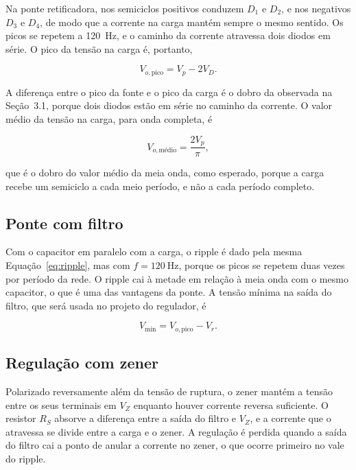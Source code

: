 \documentclass[11pt,a4paper]{article}
\begin{document}
Na ponte retificadora, nos semiciclos positivos conduzem \(D_1\) e \(D_2\), e nos negativos \(D_3\) e \(D_4\), de modo que a corrente na carga mantém sempre o mesmo sentido. Os picos se repetem a \SI{120}{\hertz}, e o caminho da corrente atravessa dois diodos em série. O pico da tensão na carga é, portanto,
 
\begin{equation}
V_{o,\text{pico}} = V_p - 2 V_D .
\label{eq:ponte_pico}
\end{equation}
 
A diferença entre o pico da fonte e o pico da carga é o dobro da observada na Seção~3.1, porque dois diodos estão em série no caminho da corrente. O valor médio da tensão na carga, para onda completa, é
 
\begin{equation}
V_{o,\text{médio}} = \frac{2 V_p}{\pi} ,
\label{eq:ponte_medio}
\end{equation}
 
que é o dobro do valor médio da meia onda, como esperado, porque a carga recebe um semiciclo a cada meio período, e não a cada período completo.
 
\subsection{Ponte com filtro}
 
Com o capacitor em paralelo com a carga, o ripple é dado pela mesma Equação~\eqref{eq:ripple}, mas com \(f = \SI{120}{\hertz}\), porque os picos se repetem duas vezes por período da rede. O ripple cai à metade em relação à meia onda com o mesmo capacitor, o que é uma das vantagens da ponte. A tensão mínima na saída do filtro, que será usada no projeto do regulador, é
 
\begin{equation}
V_{\min} = V_{o,\text{pico}} - V_r .
\label{eq:vmin}
\end{equation}
 
\subsection{Regulação com zener}
 
Polarizado reversamente além da tensão de ruptura, o zener mantém a tensão entre os seus terminais em \(V_Z\) enquanto houver corrente reversa suficiente. O resistor \(R_S\) absorve a diferença entre a saída do filtro e \(V_Z\), e a corrente que o atravessa se divide entre a carga e o zener. A regulação é perdida quando a saída do filtro cai a ponto de anular a corrente no zener, o que ocorre primeiro no vale do ripple.
 
\end{document}
